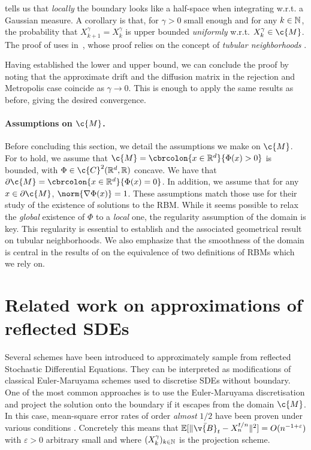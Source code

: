  tells us that \emph{locally} the boundary
looks like a half-space when integrating w.r.t. a Gaussian measure.
A corollary is that, for $\gamma > 0$ small enough and for any $k \in \mathbb{N}$, the probability that $X_{k+1}^\gamma = X_k^\gamma$ is upper bounded \emph{uniformly} w.r.t.
$X_k^\gamma \in \c{M}$.
The proof of  uses  in~, whose proof relies on the concept of \emph{tubular neighborhoods} \parencite{lee2013smooth}.

Having established the lower and upper bound, we can conclude the proof by noting that the approximate drift and the diffusion matrix in the rejection and Metropolis case coincide as $\gamma \to 0$.
This is enough to apply the same results as before, giving the desired convergence.

\paragraph{Assumptions on $\c{M}$.}
Before concluding this section, we detail the assumptions we make on $\c{M}$.
For  to hold, we assume that $\c{M} = \cbrcolon{x \in \R^d}{\Phi(x) > 0}$ is bounded, with $\Phi \in \c{C}^2(\R^d, \R)$ concave.
We have that $\partial \c{M} = \cbrcolon{x \in \R^d}{\Phi(x) = 0}$.
In addition, we assume that for any $x \in \partial \c{M}$, $\norm{\nabla \Phi(x)} = 1$.
These assumptions match those \cite{stroock1971diffusion} use for their study of the existence of solutions to the RBM.
While it seems possible to relax the \emph{global} existence of $\Phi$ to a \emph{local} one, the regularity assumption of the domain is key.
This regularity is essential to establish  and the associated geometrical result on tubular neighborhoods.
We also emphasize that the smoothness of the domain is central in the results of \cite{kang2017submartingale} on the equivalence of two definitions of RBMs which we rely on.

\section{Related work on approximations of reflected SDEs}

Several schemes have been introduced to approximately sample from reflected Stochastic Differential Equations.
They can be interpreted as modifications of classical Euler-Maruyama schemes used to discretise SDEs without boundary.
One of the most common approaches is to use the Euler-Maruyama discretisation and project the solution onto the boundary if it escapes from the domain $\c{M}$.
In this case, mean-square error rates of order \emph{almost} $1/2$ have been proven under various conditions \parencite{liu1995discretization,chitashvili1981strong,pettersson1995approximations,slominski1994approximation}.
Concretely this means that $\E[\| \bar{\v{B}}_{t} - X_{n}^{t/n}\|^2] = O(n^{-1+\varepsilon})$ with $\varepsilon>0$ arbitrary small and where $(X_k^\gamma)_{k \in \mathbb{N}}$ is the projection scheme.

